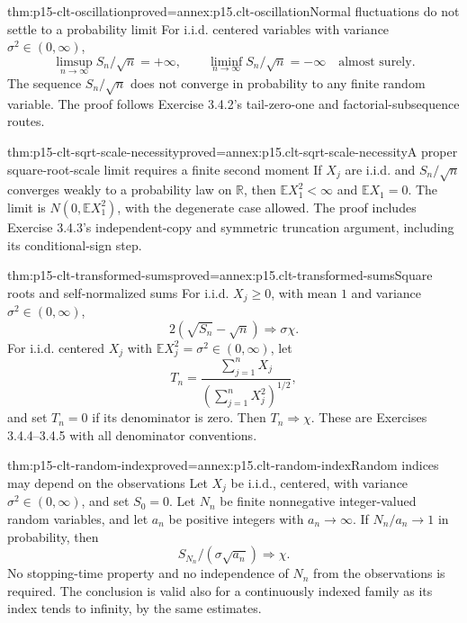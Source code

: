 \begin{hbtheorem}{thm:p15-clt-oscillation}{proved=annex:p15.clt-oscillation}{Normal fluctuations do not settle to a probability limit}
For i.i.d. centered variables with variance
\(\sigma^2\in(0,\infty)\),
\[
 \limsup_{n\to\infty}S_n/\sqrt n=+\infty,\qquad
 \liminf_{n\to\infty}S_n/\sqrt n=-\infty
                                                \quad\text{almost surely}.
 \]
The sequence \(S_n/\sqrt n\) does not converge in probability
to any finite random variable. The proof follows Exercise 3.4.2's
tail-zero-one and factorial-subsequence routes.
\end{hbtheorem}

\begin{hbtheorem}{thm:p15-clt-sqrt-scale-necessity}{proved=annex:p15.clt-sqrt-scale-necessity}{A proper square-root-scale limit requires a finite second moment}
If \(X_j\) are i.i.d. and \(S_n/\sqrt n\) converges weakly to
a probability law on \(\mathbb R\), then
\(\mathbb EX_1^2<\infty\) and \(\mathbb EX_1=0\).
The limit is \(N(0,\mathbb EX_1^2)\), with the degenerate case
allowed. The proof includes Exercise 3.4.3's independent-copy
and symmetric truncation argument, including its conditional-sign step.
\end{hbtheorem}

\begin{hbtheorem}{thm:p15-clt-transformed-sums}{proved=annex:p15.clt-transformed-sums}{Square roots and self-normalized sums}
For i.i.d. \(X_j\geq0\), with mean \(1\) and variance
\(\sigma^2\in(0,\infty)\),
\[
 2(\sqrt{S_n}-\sqrt n)\Rightarrow\sigma\chi.
\]
For i.i.d. centered \(X_j\) with
\(\mathbb EX_j^2=\sigma^2\in(0,\infty)\), let
\[
 T_n=\frac{\sum_{j=1}^nX_j}{(\sum_{j=1}^nX_j^2)^{1/2}},
 \]
and set \(T_n=0\) if its denominator is zero. Then
\(T_n\Rightarrow\chi\).
These are Exercises 3.4.4--3.4.5 with all denominator conventions.
\end{hbtheorem}

\begin{hbtheorem}{thm:p15-clt-random-index}{proved=annex:p15.clt-random-index}{Random indices may depend on the observations}
Let \(X_j\) be i.i.d., centered, with variance
\(\sigma^2\in(0,\infty)\), and set \(S_0=0\).
Let \(N_n\) be finite nonnegative integer-valued random variables,
and let \(a_n\) be positive integers with \(a_n\to\infty\).
If \(N_n/a_n\to1\) in probability, then
\[
 S_{N_n}/(\sigma\sqrt{a_n})\Rightarrow\chi.
 \]
No stopping-time property and no independence of \(N_n\) from
the observations is required. The conclusion is valid also for
a continuously indexed family as its index tends to infinity,
by the same estimates.
\end{hbtheorem}

